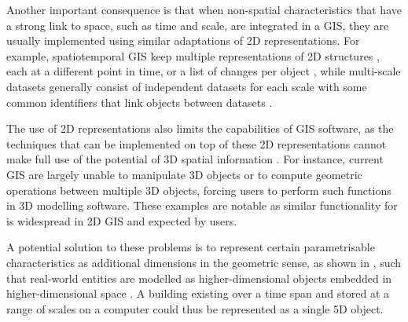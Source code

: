 
Another important consequence is that when non-spatial characteristics that have a strong link to space, such as time and scale, are integrated in a GIS, they are usually implemented using similar adaptations of 2D representations.
For example, spatiotemporal GIS keep multiple representations of 2D structures \citep{Armstrong88}, each at a different point in time, or a list of changes per object \citep{Worboys92,Peuquet94}, while multi-scale datasets generally consist of independent datasets for each scale with some common identifiers that link objects between datasets \citep{Friis-Christensen03,Stoter14}.


The use of 2D representations also limits the capabilities of GIS software, as the techniques that can be implemented on top of these 2D representations cannot make full use of the potential of 3D spatial information \citep[Ch.~3]{Zlatanova00}.
For instance, current GIS are largely unable to manipulate 3D objects or to compute geometric operations between multiple 3D objects, forcing users to perform such functions in 3D modelling software.
These examples are notable as similar functionality for is widespread in 2D GIS and expected by users.


A potential solution to these problems is to represent certain parametrisable characteristics as additional dimensions in the geometric sense, as shown in , such that real-world entities are modelled as higher-dimensional objects embedded in higher-dimensional space \citep{vanOosterom10}.
A building existing over a time span and stored at a range of scales on a computer could thus be represented as a single 5D object.


